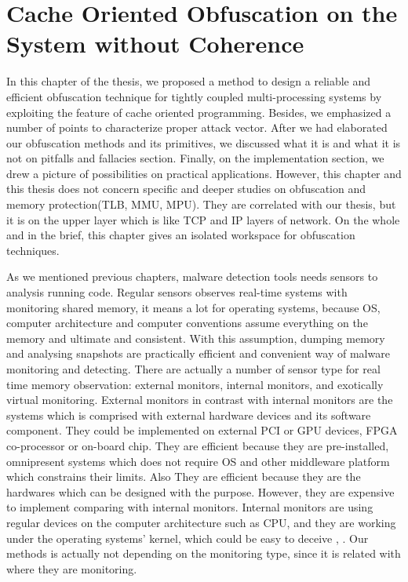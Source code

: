 \chapter{Cache Oriented Obfuscation on the System without Coherence}

In this chapter of the thesis, we proposed a method to design a reliable and efficient obfuscation technique for tightly coupled multi-processing systems by exploiting the feature of cache oriented programming. Besides, we emphasized a number of points to characterize proper attack vector. After we had elaborated our obfuscation methods and its primitives, we discussed what it is and what it is not on pitfalls and fallacies section. Finally, on the implementation section, we drew a picture of possibilities on practical applications. However, this chapter and this thesis does not concern specific and deeper studies on obfuscation and memory protection(TLB, MMU, MPU). They are correlated with our thesis, but it is on the upper layer which is like TCP and IP layers of network. On the whole and in the brief, this chapter gives an isolated workspace for obfuscation techniques.

As we mentioned previous chapters, malware detection tools needs sensors to analysis running code. Regular sensors observes real-time systems with monitoring shared memory, it means a lot for operating systems, because OS, computer architecture and computer conventions assume everything on the memory and ultimate and consistent. With this assumption, dumping memory and analysing snapshots are practically efficient and convenient way of malware monitoring and detecting. There are actually a number of sensor type for real time memory observation: external monitors, internal monitors, and exotically virtual monitoring. External monitors in contrast with internal monitors are the systems which is comprised with external hardware devices and its software component. They could be implemented on external PCI or GPU devices, FPGA co-processor or on-board chip\cite{Christos2013}. They are efficient because they are pre-installed, omnipresent systems which does not require OS and other middleware platform which constrains their limits. Also They are efficient because they are the hardwares which can be designed with the purpose. However, they are expensive to implement comparing with internal monitors. Internal monitors are using regular devices on the computer architecture such as CPU, and they are working under the operating systems' kernel, which could be easy to deceive \cite{Adnan2011}, \cite{rutkowska2006rootkits}. Our methods is actually not depending on the monitoring type, since it is related with where they are monitoring.

